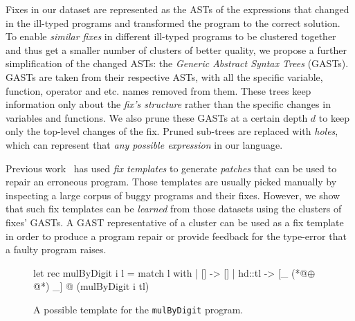 Fixes in our dataset are represented as the ASTs of the expressions that changed
in the ill-typed programs and transformed the program to the correct solution.
To enable \emph{similar fixes} in different ill-typed programs to be clustered
together and thus get a smaller number of clusters of better quality, we propose
a further simplification of the changed ASTs: the \emph{Generic Abstract Syntax
Trees} (GASTs). GASTs are taken from their respective ASTs, with all the
specific variable, function, operator and etc. names removed from them. These
trees keep information only about the \emph{fix's structure} rather than the
specific changes in variables and functions. We also prune these GASTs at a
certain depth $d$ to keep only the top-level changes of the fix. Pruned
sub-trees are replaced with \emph{holes}, which can represent that \emph{any
possible expression} in our language.


 Previous work~\citep[][]{martinez2013automatically,
martinez2015mining} has used \emph{fix templates} to generate \emph{patches}
that can be used to repair an erroneous program. Those templates are usually
picked manually by inspecting a large corpus of buggy programs and their fixes.
However, we show that such fix templates can be \emph{learned} from those
datasets using the clusters of fixes' GASTs. A GAST representative of a cluster
can be used as a fix template in order to produce a program repair or provide
feedback for the type-error that a faulty program raises.


\begin{figure}[ht]
\begin{ecode}
let rec mulByDigit i l =
  match l with
  | []     -> []
  | hd::tl -> [_ (*@$\oplus$@*) _] @ (mulByDigit i tl)
\end{ecode}
\caption{A possible template for the \texttt{mulByDigit} program.}
\label{fig:suggestion}
\end{figure}


